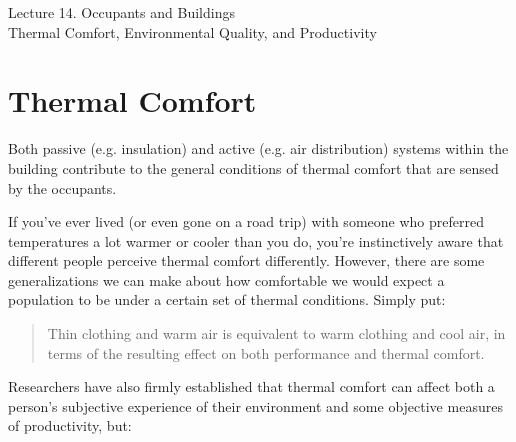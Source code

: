 \documentclass[10pt]{article}
\begin{document}
   \noindent
   \begin{center}

   \hrulefill
   
   \vspace{5pt}
   
   \vspace{0pt}
   
   {\Large \hfill  Lecture 14. Occupants and Buildings\\ \hfill {\large Thermal Comfort, Environmental Quality, and Productivity}}
   \vspace{5pt}
   
  
   \hrulefill
   \end{center}

{}

\section{Thermal Comfort}

Both passive (e.g. insulation) and active (e.g. air distribution) systems within the building contribute to the general conditions of thermal comfort that are sensed by the occupants.

If you've ever lived (or even gone on a road trip) with someone who preferred temperatures a lot warmer or cooler than you do, you're instinctively aware that different people perceive thermal comfort differently. However, there are some generalizations we can make about how comfortable we would expect a population to be under a certain set of thermal conditions. Simply put:

\begin{quote}
    Thin clothing and warm air is equivalent to warm clothing and cool air, in terms of the resulting effect on both performance and thermal comfort. \cite{Wargocki2017-ny}
\end{quote}

Researchers have also firmly established that thermal comfort can affect both a person's subjective experience of their environment and some objective measures of productivity, but:
\end{document}
